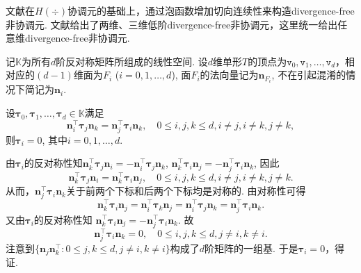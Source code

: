 文献\cite{XieXuXue2008}在$H(\div)$协调元的基础上，通过泡函数增加切向连续性来构造divergence-free非协调元.
文献\cite{XieXuXue2008}给出了两维、三维低阶divergence-free非协调元，这里统一给出任意维divergence-free非协调元.

记$\mathbb K$为所有$d$阶反对称矩阵所组成的线性空间. 设$d$维单形$T$的顶点为$\texttt{v}_0, \texttt{v}_1, \ldots, \texttt{v}_d$，相对应的$(d-1)$维面为$F_i$ ($i=0,1,\ldots, d$), 面$F_i$的法向量记为$\boldsymbol{n}_{F_i}$, 不在引起混淆的情况下简记为$\boldsymbol{n}_{i}$.

\begin{lemma}\label{lem:divfreencfmK}
设$\boldsymbol{\tau}_0, \boldsymbol{\tau}_1, \ldots, \boldsymbol{\tau}_d\in\mathbb K$满足
\begin{equation*}
\boldsymbol{n}_i^{\intercal}\boldsymbol{\tau}_j\boldsymbol{n}_k=\boldsymbol{n}_j^{\intercal}\boldsymbol{\tau}_i\boldsymbol{n}_k,\quad 0\leq i,j,k\leq d, i\neq j, i\neq k, j\neq k, 
\end{equation*}
则$\boldsymbol{\tau}_i=0$, 其中$i=0,1,\ldots, d$.
\end{lemma}
\begin{prf}
由$\boldsymbol{\tau}_i$的反对称性知$\boldsymbol{n}_k^{\intercal}\boldsymbol{\tau}_j\boldsymbol{n}_i=-\boldsymbol{n}_i^{\intercal}\boldsymbol{\tau}_j\boldsymbol{n}_k$, $\boldsymbol{n}_k^{\intercal}\boldsymbol{\tau}_i\boldsymbol{n}_j=-\boldsymbol{n}_j^{\intercal}\boldsymbol{\tau}_i\boldsymbol{n}_k$, 因此
\begin{equation*}
\boldsymbol{n}_k^{\intercal}\boldsymbol{\tau}_j\boldsymbol{n}_i=\boldsymbol{n}_k^{\intercal}\boldsymbol{\tau}_i\boldsymbol{n}_j,\quad 0\leq i,j,k\leq d, i\neq j, i\neq k, j\neq k. 
\end{equation*}
从而，$\boldsymbol{n}_j^{\intercal}\boldsymbol{\tau}_i\boldsymbol{n}_k$关于前两个下标和后两个下标均是对称的. 由对称性可得
\begin{equation*}
\boldsymbol{n}_k^{\intercal}\boldsymbol{\tau}_i\boldsymbol{n}_j=\boldsymbol{n}_i^{\intercal}\boldsymbol{\tau}_k\boldsymbol{n}_j=\boldsymbol{n}_i^{\intercal}\boldsymbol{\tau}_j\boldsymbol{n}_k=\boldsymbol{n}_j^{\intercal}\boldsymbol{\tau}_i\boldsymbol{n}_k.
\end{equation*}
又由$\boldsymbol{\tau}_i$的反对称性知 $\boldsymbol{n}_k^{\intercal}\boldsymbol{\tau}_i\boldsymbol{n}_j=-\boldsymbol{n}_j^{\intercal}\boldsymbol{\tau}_i\boldsymbol{n}_k$. 故
\begin{equation*}
\boldsymbol{n}_j^{\intercal}\boldsymbol{\tau}_i\boldsymbol{n}_k=0,\quad 0\leq i,j,k\leq d, j\neq i, k\neq i. 
\end{equation*}
注意到$\{\boldsymbol{n}_j\boldsymbol{n}_k^{\intercal}: 0\leq j,k\leq d, j\neq i, k\neq i\}$构成了$d$阶矩阵的一组基. 于是$\boldsymbol{\tau}_i=0$，得证.
\end{prf}


